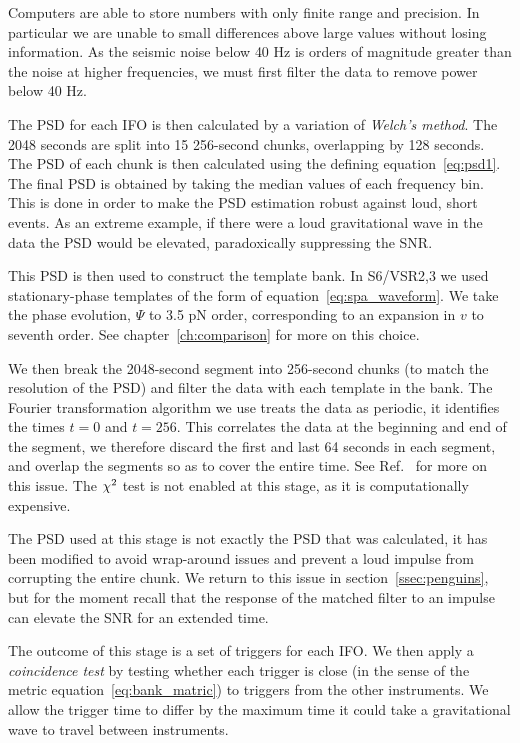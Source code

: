 Computers are able to store numbers with only finite range and
precision.  In particular we are unable to small differences above
large values without losing information.  As the seismic noise below
40 Hz is orders of magnitude greater than the noise at higher
frequencies, we must first filter the data to remove power below 40 Hz. 

The PSD for each IFO is then calculated by a variation of
\emph{Welch's method}.  The 2048 seconds are split into 15 256-second
chunks, overlapping by 128 seconds.  The PSD of each chunk is then
calculated using the defining equation~\ref{eq:psd1}.  The final PSD
is obtained by taking the median values of each frequency bin. This is
done in order to make the PSD estimation robust against loud, short
events.  As an extreme example, if there were a loud gravitational
wave in the data the PSD would be elevated, paradoxically suppressing
the SNR. 

This PSD is then used to construct the template bank.  In S6/VSR2,3 we
used stationary-phase templates of the form of
equation~\ref{eq:spa_waveform}.   We take the phase evolution, $\Psi$
to 3.5 pN order, corresponding to an expansion in $v$ to seventh
order.   See chapter~\ref{ch:comparison} for more on this choice.

We then break the 2048-second segment into 256-second chunks (to match
the resolution of the PSD) and filter the data with each template in
the bank.  The Fourier transformation algorithm we use treats the data
as periodic, it identifies the times $t=0$ and $t=256$.  This
correlates the data at the beginning and end of the segment, we
therefore discard the first and last 64 seconds in each segment, and
overlap the segments so as to cover the entire time.  See
Ref.~\cite{DBrownThesis} for more on this issue.  The $\chi^2$ test is
not enabled at this stage, as it is computationally expensive.  

The PSD used at this stage is not exactly the PSD that was calculated,
it has been modified to avoid wrap-around issues and prevent a loud
impulse from corrupting the entire chunk.  We return to this issue in
section~\ref{ssec:penguins}, but for the moment recall that the
response of the matched filter to an impulse can elevate the SNR for
an extended time.

The outcome of this stage is a set of triggers for each IFO.  We then
apply a \emph{coincidence test} by testing whether each trigger is
close (in the sense of the metric equation~\ref{eq:bank_matric}) to
triggers from the other instruments.  We allow the trigger time to
differ by the maximum time it could take a gravitational wave to
travel between instruments.

